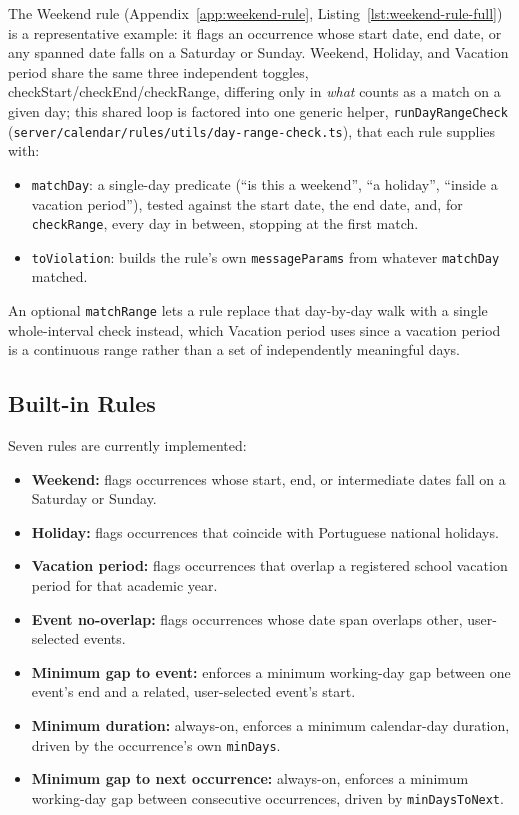 The Weekend rule (Appendix~\ref{app:weekend-rule}, Listing~\ref{lst:weekend-rule-full}) is a representative example: it flags an occurrence whose start date, end date, or any spanned date falls on a Saturday or Sunday. Weekend, Holiday, and Vacation period share the same three independent toggles, checkStart/checkEnd/checkRange, differing only in \emph{what} counts as a match on a given day; this shared loop is factored into one generic helper, \texttt{runDayRangeCheck} (\texttt{server/calendar/rules/utils/day-range-check.ts}), that each rule supplies with:

\begin{itemize}
    \item \texttt{matchDay}: a single-day predicate (``is this a weekend'', ``a holiday'', ``inside a vacation period''), tested against the start date, the end date, and, for \texttt{checkRange}, every day in between, stopping at the first match.
    \item \texttt{toViolation}: builds the rule's own \texttt{messageParams} from whatever \texttt{matchDay} matched.
\end{itemize}

An optional \texttt{matchRange} lets a rule replace that day-by-day walk with a single whole-interval check instead, which Vacation period uses since a vacation period is a continuous range rather than a set of independently meaningful days.

\subsection{Built-in Rules} \label{sec:built-in-rules}

Seven rules are currently implemented:

\begin{itemize}
    \item \textbf{Weekend:} flags occurrences whose start, end, or intermediate dates fall on a Saturday or Sunday.
    \item \textbf{Holiday:} flags occurrences that coincide with Portuguese national holidays.
    \item \textbf{Vacation period:} flags occurrences that overlap a registered school vacation period for that academic year.
    \item \textbf{Event no-overlap:} flags occurrences whose date span overlaps other, user-selected events.
    \item \textbf{Minimum gap to event:} enforces a minimum working-day gap between one event's end and a related, user-selected event's start.
    \item \textbf{Minimum duration:} always-on, enforces a minimum calendar-day duration, driven by the occurrence's own \texttt{minDays}.
    \item \textbf{Minimum gap to next occurrence:} always-on, enforces a minimum working-day gap between consecutive occurrences, driven by \texttt{minDaysToNext}.
\end{itemize}

